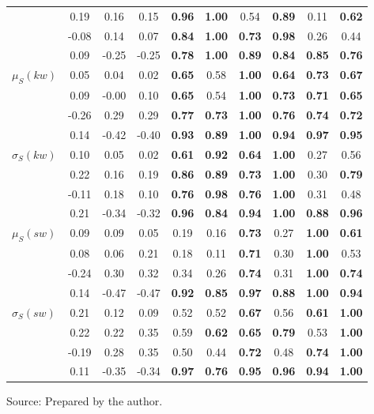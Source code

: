 \begin{table*}[h!]
\begin{center}
\begin{tabular}{| l || c | c | c | c | c | c | c | c | c |}
 & 0.19 & 0.16 & 0.15 & {\bf 0.96} & {\bf 1.00} & 0.54 & {\bf 0.89} & 0.11 & {\bf 0.62} \\
 & -0.08 & 0.14 & 0.07 & {\bf 0.84} & {\bf 1.00} & {\bf 0.73} & {\bf 0.98} & 0.26 & 0.44 \\
 & 0.09 & -0.25 & -0.25 & {\bf 0.78} & {\bf 1.00} & {\bf 0.89} & {\bf 0.84} & {\bf 0.85} & {\bf 0.76} \\\hline
$\mu_S(kw)$ & 0.05 & 0.04 & 0.02 & {\bf 0.65} & 0.58 & {\bf 1.00} & {\bf 0.64} & {\bf 0.73} & {\bf 0.67} \\
 & 0.09 & -0.00 & 0.10 & {\bf 0.65} & 0.54 & {\bf 1.00} & {\bf 0.73} & {\bf 0.71} & {\bf 0.65} \\
 & -0.26 & 0.29 & 0.29 & {\bf 0.77} & {\bf 0.73} & {\bf 1.00} & {\bf 0.76} & {\bf 0.74} & {\bf 0.72} \\
 & 0.14 & -0.42 & -0.40 & {\bf 0.93} & {\bf 0.89} & {\bf 1.00} & {\bf 0.94} & {\bf 0.97} & {\bf 0.95} \\\hline
$\sigma_S(kw)$ & 0.10 & 0.05 & 0.02 & {\bf 0.61} & {\bf 0.92} & {\bf 0.64} & {\bf 1.00} & 0.27 & 0.56 \\
 & 0.22 & 0.16 & 0.19 & {\bf 0.86} & {\bf 0.89} & {\bf 0.73} & {\bf 1.00} & 0.30 & {\bf 0.79} \\
 & -0.11 & 0.18 & 0.10 & {\bf 0.76} & {\bf 0.98} & {\bf 0.76} & {\bf 1.00} & 0.31 & 0.48 \\
 & 0.21 & -0.34 & -0.32 & {\bf 0.96} & {\bf 0.84} & {\bf 0.94} & {\bf 1.00} & {\bf 0.88} & {\bf 0.96} \\\hline
$\mu_S(sw)$ & 0.09 & 0.09 & 0.05 & 0.19 & 0.16 & {\bf 0.73} & 0.27 & {\bf 1.00} & {\bf 0.61} \\
 & 0.08 & 0.06 & 0.21 & 0.18 & 0.11 & {\bf 0.71} & 0.30 & {\bf 1.00} & 0.53 \\
 & -0.24 & 0.30 & 0.32 & 0.34 & 0.26 & {\bf 0.74} & 0.31 & {\bf 1.00} & {\bf 0.74} \\
 & 0.14 & -0.47 & -0.47 & {\bf 0.92} & {\bf 0.85} & {\bf 0.97} & {\bf 0.88} & {\bf 1.00} & {\bf 0.94} \\\hline
$\sigma_S(sw)$ & 0.21 & 0.12 & 0.09 & 0.52 & 0.52 & {\bf 0.67} & 0.56 & {\bf 0.61} & {\bf 1.00} \\
 & 0.22 & 0.22 & 0.35 & 0.59 & {\bf 0.62} & {\bf 0.65} & {\bf 0.79} & 0.53 & {\bf 1.00} \\
 & -0.19 & 0.28 & 0.35 & 0.50 & 0.44 & {\bf 0.72} & 0.48 & {\bf 0.74} & {\bf 1.00} \\
 & 0.11 & -0.35 & -0.34 & {\bf 0.97} & {\bf 0.76} & {\bf 0.95} & {\bf 0.96} & {\bf 0.94} & {\bf 1.00} \\\hline
\end{tabular}
\begin{flushleft}
		Source: Prepared by the author.\
\end{flushleft}
\end{center}
\end{table*}
